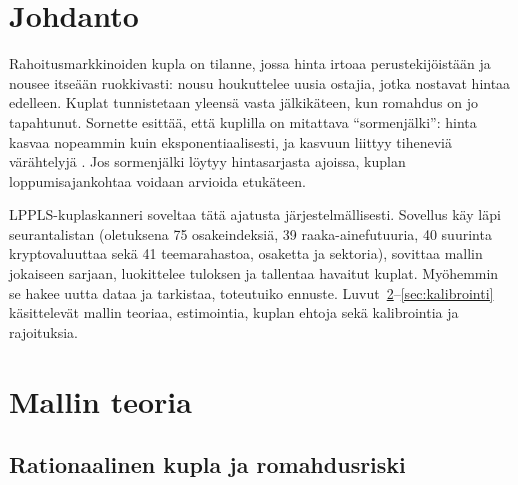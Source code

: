 \documentclass[10pt,a4paper]{article}
\begin{document}
\section{Johdanto}

Rahoitusmarkkinoiden kupla on tilanne, jossa hinta irtoaa perustekijöistään ja nousee
itseään ruokkivasti: nousu houkuttelee uusia ostajia, jotka nostavat hintaa edelleen. Kuplat
tunnistetaan yleensä vasta jälkikäteen, kun romahdus on jo tapahtunut. Sornette esittää, että
kuplilla on mitattava \enquote{sormenjälki}: hinta kasvaa nopeammin kuin eksponentiaalisesti, ja
kasvuun liittyy tiheneviä värähtelyjä \citep{sornette2003,johansen2010}. Jos sormenjälki löytyy
hintasarjasta ajoissa, kuplan loppumisajankohtaa voidaan arvioida etukäteen.

LPPLS-kuplaskanneri soveltaa tätä ajatusta järjestelmällisesti. Sovellus käy läpi
seurantalistan (oletuksena 75 osakeindeksiä, 39 raaka-ainefutuuria, 40 suurinta kryptovaluuttaa
sekä 41 teemarahastoa, osaketta ja sektoria), sovittaa mallin jokaiseen sarjaan, luokittelee
tuloksen ja tallentaa havaitut kuplat. Myöhemmin se hakee uutta dataa ja tarkistaa, toteutuiko
ennuste. Luvut~\ref{sec:teoria}--\ref{sec:kalibrointi} käsittelevät mallin teoriaa, estimointia,
kuplan ehtoja sekä kalibrointia ja rajoituksia.

\section{Mallin teoria}\label{sec:teoria}

\subsection{Rationaalinen kupla ja romahdusriski}
\end{document}
